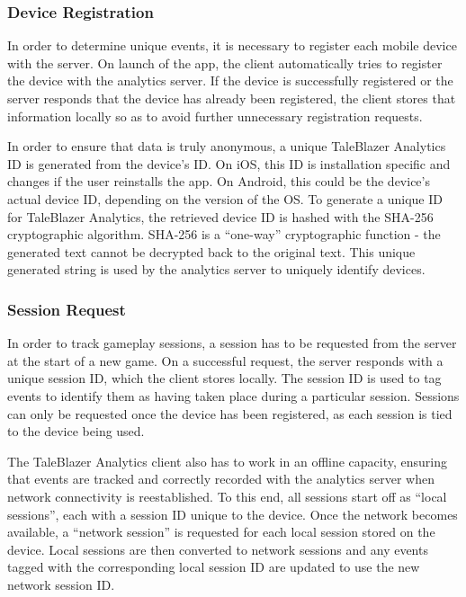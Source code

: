 \subsubsection{Device Registration}

In order to determine unique events, it is necessary to register each mobile device with the server. On launch of the app, the client automatically tries to register the device with the analytics server. If the device is successfully registered or the server responds that the device has already been registered, the client stores that information locally so as to avoid further unnecessary registration requests.

In order to ensure that data is truly anonymous, a unique TaleBlazer Analytics ID is generated from the device's ID. On iOS, this ID is installation specific and changes if the user reinstalls the app. On Android, this could be the device's actual device ID, depending on the version of the OS. To generate a unique ID for TaleBlazer Analytics, the retrieved device ID is hashed with the SHA-256 cryptographic algorithm. SHA-256 is a ``one-way'' cryptographic function - the generated text cannot be decrypted back to the original text. This unique generated string is used by the analytics server to uniquely identify devices. 

\subsubsection{Session Request} \label{subsubsec:session_request}

In order to track gameplay sessions, a session has to be requested from the server at the start of a new game. On a successful request, the server responds with a unique session ID, which the client stores locally. The session ID is used to tag events to identify them as having taken place during a particular session. Sessions can only be requested once the device has been registered, as each session is tied to the device being used.

The TaleBlazer Analytics client also has to work in an offline capacity, ensuring that events are tracked and correctly recorded with the analytics server when network connectivity is reestablished. To this end, all sessions start off as ``local sessions'', each with a session ID unique to the device. Once the network becomes available, a ``network session'' is requested for each local session stored on the device. Local sessions are then converted to network sessions and any events tagged with the corresponding local session ID are updated to use the new network session ID. 

